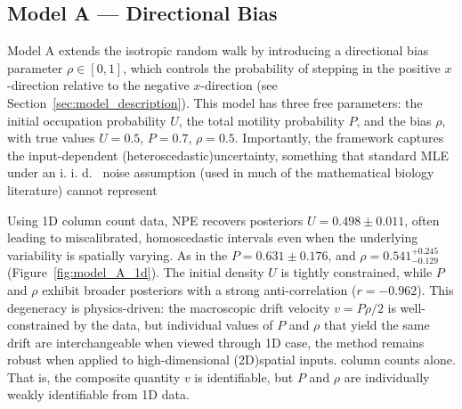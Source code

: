 \documentclass{article}
\providecommand{\DIFaddtex}[1]{{\protect\color{blue} \sf #1}} %
\providecommand{\DIFdeltex}[1]{{\protect\color{red} \scriptsize #1}} %
\providecommand{\DIFaddbegin}{} %
\providecommand{\DIFaddend}{} %
\providecommand{\DIFdelbegin}{} %
\providecommand{\DIFdelend}{} %
\providecommand{\DIFadd}[1]{\texorpdfstring{\DIFaddtex{#1}}{#1}} %
\providecommand{\DIFdel}[1]{\texorpdfstring{\DIFdeltex{#1}}{}} %
\newcommand{\DIFscaledelfig}{0.5}
\newlength{\DIFdelgraphicswidth} %
\newlength{\DIFdelgraphicsheight} %
\newcommand{\DIFaddincludegraphics}[2][]{{\color{blue}\fbox{\DIFOincludegraphics[#1]{#2}}}} %
\newcommand{\DIFdelincludegraphics}[2][]{%
\sbox{\DIFdelgraphicsbox}{\DIFOincludegraphics[#1]{#2}}%
\settoboxwidth{\DIFdelgraphicswidth}{\DIFdelgraphicsbox} %
\settoboxtotalheight{\DIFdelgraphicsheight}{\DIFdelgraphicsbox} %
\scalebox{\DIFscaledelfig}{%
\parbox[b]{\DIFdelgraphicswidth}{\usebox{\DIFdelgraphicsbox}\\[-\baselineskip] \rule{\DIFdelgraphicswidth}{0em}}\llap{\resizebox{\DIFdelgraphicswidth}{\DIFdelgraphicsheight}{%
\setlength{\unitlength}{\DIFdelgraphicswidth}%
\begin{picture}(1,1)%
\thicklines\linethickness{2pt} %
{\color[rgb]{1,0,0}\put(0,0){\framebox(1,1){}}}%
{\color[rgb]{1,0,0}\put(0,0){\line( 1,1){1}}}%
{\color[rgb]{1,0,0}\put(0,1){\line(1,-1){1}}}%
\end{picture}%
}\hspace*{3pt}}} %
} %
\DeclareRobustCommand{\DIFaddbegin}{\DIFOaddbegin \let\includegraphics\DIFaddincludegraphics} %
\DeclareRobustCommand{\DIFaddend}{\DIFOaddend \let\includegraphics\DIFOincludegraphics} %
\DeclareRobustCommand{\DIFdelbegin}{\DIFOdelbegin \let\includegraphics\DIFdelincludegraphics} %
\DeclareRobustCommand{\DIFdelend}{\DIFOaddend \let\includegraphics\DIFOincludegraphics} %
\begin{document}
\subsection{\DIFadd{Model A --- Directional Bias}}\label{sec:model_a}

\DIFadd{Model A extends the isotropic random walk by introducing a directional bias parameter $\rho \in [0,1]$, which controls the probability of stepping in the positive $x$-direction relative to the negative $x$-direction (see Section~\ref{sec:model_description}). This model has three free parameters: the initial occupation probability $U$, the total motility probability $P$, and the bias $\rho$, with true values $U = 0.5$, $P = 0.7$, $\rho = 0.5$}\DIFaddend .
\DIFdelbegin \DIFdel{Importantly, the framework captures the input-dependent (heteroscedastic)uncertainty, something that standard MLE under an i. i. d. \ noise assumption (used in much of the mathematical biology literature) cannot represent }\DIFdelend \DIFaddbegin 

\DIFadd{Using 1D column count data, NPE recovers posteriors $U = 0.498 \pm 0.011$}\DIFaddend , \DIFdelbegin \DIFdel{often leading to miscalibrated, homoscedastic intervals even when the underlying variability is spatially varying.
As in the }\DIFdelend \DIFaddbegin \DIFadd{$P = 0.631 \pm 0.176$, and $\rho = 0.541^{+0.245}_{-0.129}$ (Figure~\ref{fig:model_A_1d}). The initial density $U$ is tightly constrained, while $P$ and $\rho$ exhibit broader posteriors with a strong anti-correlation ($r = -0.962$). This degeneracy is physics-driven: the macroscopic drift velocity $v = P\rho/2$ is well-constrained by the data, but individual values of $P$ and $\rho$ that yield the same drift are interchangeable when viewed through }\DIFaddend 1D \DIFdelbegin \DIFdel{case, the method remains robust when applied to high-dimensional (2D)spatial inputs. }\DIFdelend \DIFaddbegin \DIFadd{column counts alone. That is, the composite quantity $v$ is identifiable, but $P$ and $\rho$ are individually weakly identifiable from 1D data.
}\DIFaddend 
\end{document}
